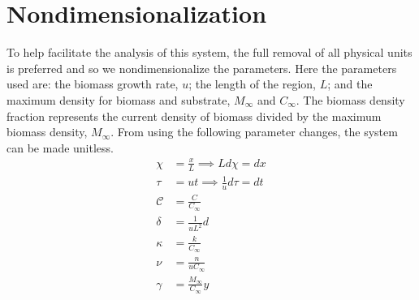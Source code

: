 \section{Nondimensionalization}
 

To help facilitate the analysis of this system, the full removal of all physical units is preferred and so we nondimensionalize the parameters.
Here the parameters used are: the biomass growth rate, $u$; the length of the region, $L$; and the maximum density for biomass and substrate, $M_\infty$ and $C_\infty$.
The biomass density fraction represents the current density of biomass divided by the maximum biomass density, $M_{\infty}$.
From using the following parameter changes, the system can be made unitless.
\begin{align}
  \chi &= \frac{x}{L} \implies L d\chi= dx \\
  \tau &= u t \implies \frac{1}{u} d\tau= dt \\
  \mathcal{C} &= \frac{C}{C_{\infty}} \\
  \delta &= \frac{1}{u L^2} d \\
  \kappa &= \frac{k}{C_\infty} \\
  \nu &= \frac{n}{u C_\infty} \\
  \gamma &= \frac{M_\infty}{C_\infty} y
\end{align}

